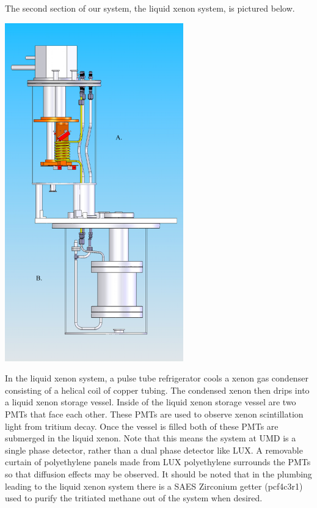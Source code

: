 \documentclass[a4paper,12pt]{article}
\begin{document}
The second section of our system, the liquid xenon system, is pictured below.

\begin{center}
\includegraphics[scale=0.75]{cryo.png}
\end{center}

In the liquid xenon system, a pulse tube refrigerator cools a xenon gas condenser consisting of a helical coil of copper tubing.  The condensed xenon then drips into a liquid xenon storage vessel.  Inside of the liquid xenon storage vessel are two PMTs that face each other. These PMTs are used to observe xenon scintillation light from tritium decay. Once the vessel is filled both of these PMTs are submerged in the liquid xenon.  Note that this means the system at UMD is a single phase detector, rather than a dual phase detector like LUX.  A removable curtain of polyethylene panels made from LUX polyethylene surrounds the PMTs so that diffusion effects may be observed.  It should be noted that in the plumbing leading to the liquid xenon system there is a SAES Zirconium getter (pcf4c3r1) used to purify the tritiated methane out of the system when desired.
\end{document}
